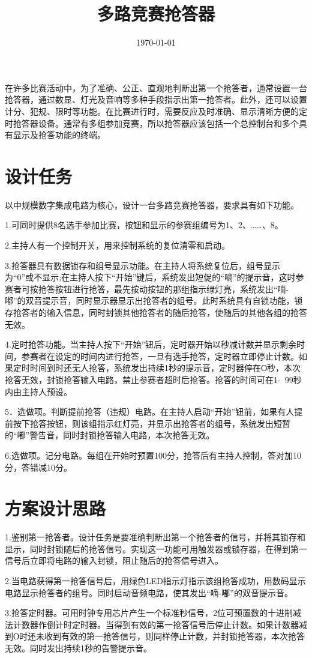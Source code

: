 \documentclass{../source/Experiment}
\title{多路竞赛抢答器}
\date{\today}
\begin{document}
    \makecover
    在许多比赛活动中，为了准确、公正、直观地判断出第一个抢答者，通常设置一台抢答器，通过数显、灯光及音响等多种手段指示出第一抢答者。此外，还可以设置计分、犯规、限时等功能。在比赛进行时，需要反应及时准确、显示清晰方便的定时抢答器设备。通常有多组参加竞赛，所以抢答器应该包括一个总控制台和多个具有显示及抢答功能的终端。
    \section{设计任务}
        以中规模数字集成电路为核心，设计一台多路竞赛抢答器，要求具有如下功能。

        1.可同时提供8名选手参加比赛，按钮和显示的参赛组编号为1、2、……、8。

        2.主持人有一个控制开关，用来控制系统的复位清零和启动。

        3.抢答器具有数据锁存和组号显示功能。在主持人将系统复位后，组号显示为“0”或不显示;在主持人按下“开始”键后，系统发出短促的“嘀”的提示音，这时参赛者可按抢答按钮进行抢答，最先按动按钮的那组指示绿灯亮，系统发出“嘀-嘟”的双音提示音，同时显示器显示出抢答者的组号。此时系统具有自锁功能，锁存抢答者的输入信息，同时封锁其他抢答者的随后抢答，使随后的其他各组的抢答无效。

        4.定时抢答功能。当主持人按下“开始”钮后，定时器开始以秒减计数并显示剩余时间，参赛者在设定的时间内进行抢答，一旦有选手抢答，定时器立即停止计数。如果定时时间到时还无人抢答，系统发出持续1秒的提示音，定时器停在О秒，本次抢答无效，封锁抢答输入电路，禁止参赛者超时后抢答。抢答的时间可在1-~99秒内由主持人预设。

        5．选做项。判断提前抢答（违规）电路。在主持人启动“开始”钮前，如果有人提前按下抢答按钮，则该组指示红灯亮，并显示出抢答者的组号，系统发出短暂的“嘟”警告音，同时封锁抢答输入电路，本次抢答无效。

        6.选做项。记分电路。每组在开始时预置100分，抢答后有主持人控制，答对加10分，答错减10分。
    \section{方案设计思路}
        1.鉴别第一抢答者。设计任务是要准确判断出第一个抢答者的信号，并将其锁存和显示，同时封锁随后的抢答信号。实现这一功能可用触发器或锁存器，在得到第一信号后立即将电路的输入封锁，阻止随后的抢答信号进入。

        2.当电路获得第一抢答信号后，用绿色LED指示灯指示该组抢答成功，用数码显示电路显示抢答者的组号。同时启动音频电路，使其发出“嘀-嘟”的双音提示音。

        3.抢答定时器。可用时钟专用芯片产生一个标准秒信号，2位可预置数的十进制减法计数器作倒计时定时器。当得到有效的第一抢答信号后停止计数。如果计数器减到О时还未收到有效的第一抢答信号，则同样停止计数，并封锁抢答器，本次抢答无效。同时发出持续1秒的告警提示音。
\end{document}
